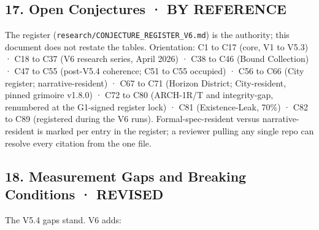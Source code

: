 \documentclass[
]{article}
\begin{document}
\subsection{17. Open Conjectures · BY
REFERENCE}\label{open-conjectures-by-reference}

The register (\texttt{research/CONJECTURE\_REGISTER\_V6.md}) is the
authority; this document does not restate the tables. Orientation: C1 to
C17 (core, V1 to V5.3) · C18 to C37 (V6 research series, April 2026) ·
C38 to C46 (Bound Collection) · C47 to C55 (post-V5.4 coherence; C51 to
C55 occupied) · C56 to C66 (City register; narrative-resident) · C67 to
C71 (Horizon District; City-resident, pinned grimoire v1.8.0) · C72 to
C80 (ARCH-1R/T and integrity-gap, renumbered at the G1-signed register
lock) · C81 (Existence-Leak, 70\%) · C82 to C89 (registered during the
V6 runs). Formal-spec-resident versus narrative-resident is marked per
entry in the register; a reviewer pulling any single repo can resolve
every citation from the one file.

\subsection{18. Measurement Gaps and Breaking Conditions ·
REVISED}\label{measurement-gaps-and-breaking-conditions-revised}

The V5.4 gaps stand. V6 adds:
\end{document}
